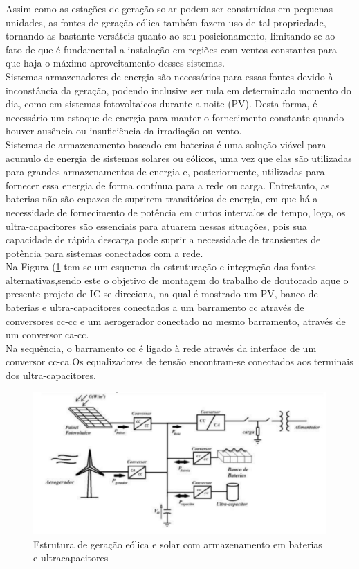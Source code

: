 \documentclass[11pt, a4paper, oneside]{article}
\begin{document}
Assim como as estações de geração solar podem ser construídas em
pequenas unidades, as fontes de geração eólica também fazem uso de tal
propriedade, tornando-as bastante versáteis quanto ao seu posicionamento,
limitando-se ao fato de que é fundamental a instalação em regiões com ventos
constantes para que haja o máximo aproveitamento desses sistemas.\\
Sistemas armazenadores de energia são necessários para essas fontes
devido à inconstância da geração, podendo inclusive ser nula em determinado
momento do dia, como em sistemas fotovoltaicos durante a noite (PV). Desta
forma, é necessário um estoque de energia para manter o fornecimento constante
quando houver ausência ou insuficiência da irradiação ou vento.\\
Sistemas de armazenamento baseado em baterias é uma solução viável para
acumulo de energia de sistemas solares ou eólicos, uma vez que elas são utilizadas para
grandes armazenamentos de energia e, posteriormente, utilizadas para fornecer
essa energia de forma contínua para a rede ou carga. Entretanto, as baterias não
são capazes de suprirem transitórios de energia, em que há a necessidade de
fornecimento de potência em curtos intervalos de tempo, logo, os ultra-capacitores
são essenciais para atuarem nessas situações, pois sua capacidade de rápida
descarga pode suprir a necessidade de transientes de potência para sistemas
conectados com a rede.\\
Na Figura (\ref{fig:estrutura_do_doutorado} tem-se um esquema da estruturação e integração das fontes
alternativas,sendo este o objetivo de montagem do trabalho de doutorado aque o
presente projeto de IC se direciona, na qual é mostrado um PV, banco de baterias e
ultra-capacitores conectados a um barramento cc através de conversores cc-cc e
um aerogerador conectado no mesmo barramento, através de um conversor ca-cc.\\
Na sequência, o barramento cc é ligado à rede através da interface de um
conversor cc-ca.Os equalizadores de tensão encontram-se conectados aos
terminais dos ultra-capacitores.

\begin{figure}[h!]
\label{fig:estrutura_do_doutorado}
\centering
\includegraphics[width=1\linewidth]{Estrutura_de_geracao_eolica_solar}
\caption{Estrutura de geração eólica e solar com armazenamento em baterias e ultracapacitores \cite{mestrado_renan}}
\end{figure}
\end{document}
